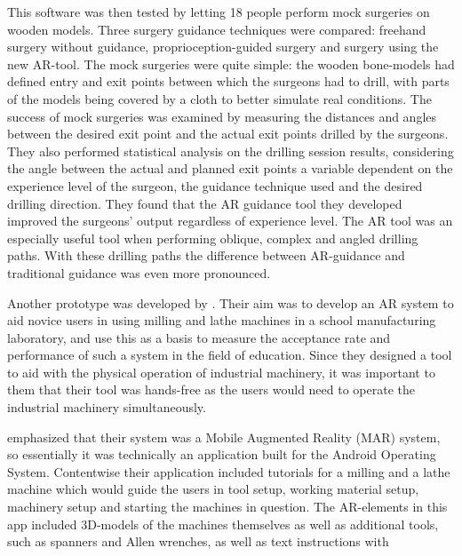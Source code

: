	This software was then tested by letting 18 people perform mock 
surgeries on wooden models.\cite{VanGestel2024} Three surgery guidance 
techniques were compared: freehand surgery without guidance, 
proprioception-guided surgery and surgery using the new 
AR-tool.\cite{VanGestel2024} The mock surgeries were quite simple: the wooden 
bone-models had defined entry and exit points between which the surgeons had 
to drill, with parts of the models being covered by a cloth to better 
simulate real conditions.\cite{VanGestel2024} The success of mock surgeries 
was examined by measuring the distances and angles between the desired exit 
point and the actual exit points drilled by the surgeons.\cite{VanGestel2024} 
They also performed statistical analysis on the drilling session results, 
considering the angle between the actual and planned exit points a variable 
dependent on the experience level of the surgeon, the guidance technique used 
and the desired drilling direction.\cite{VanGestel2024} They found that the 
AR guidance tool they developed improved the surgeons' output regardless of 
experience level.\cite{VanGestel2024} The AR tool was an especially useful 
tool when performing oblique, complex and angled drilling paths. With these 
drilling paths the difference between AR-guidance and traditional guidance was 
even more pronounced.\cite{VanGestel2024}\par
	Another prototype was developed by \textcite{reyesEtAl2016}. Their aim 
was to develop an AR system to aid novice users in using milling and lathe 
machines in a school manufacturing laboratory, and use this as a basis to 
measure the acceptance rate and performance of such a system in the field of 
education.\cite{reyesEtAl2016} Since they designed a tool to aid with the 
physical operation of industrial machinery, it was important to them that their 
tool was hands-free as the users would need to operate the industrial 
machinery simultaneously.\cite{reyesEtAl2016}\par
	\textcite{reyesEtAl2016} emphasized that their system was a Mobile 
Augmented Reality (MAR) system, so essentially it was technically an 
application built for the Android Operating System. Contentwise their 
application included tutorials for a milling and a lathe machine which would 
guide the users in tool setup, working material setup, machinery setup and 
starting the machines in question.\cite{reyesEtAl2016} The AR-elements in this 
app included 3D-models of the machines themselves as well as additional 
tools, such as spanners and Allen wrenches, as well as text instructions with 
